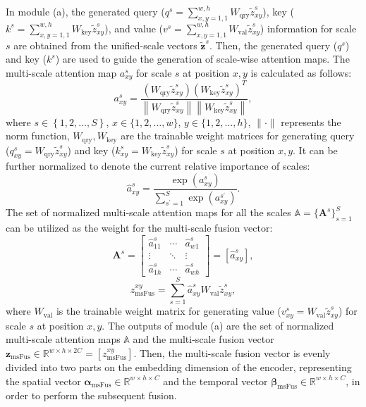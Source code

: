 \documentclass[journal]{IEEEtran}
\begin{document}
In module (a), the generated query ($  q^s = \sum_{x,y=1,1}^{w,h} W_{\mathrm{qry}}  \tilde{z}_{xy}^{s} $), key ($k^s = \sum_{x,y=1,1}^{w,h} W_{\mathrm{key}}  \tilde{z}_{xy}^{s} $), and value ($v^s = \sum_{x,y=1,1}^{w,h} W_{\mathrm{val}}  \tilde{z}_{xy}^{s}$) information for scale $ s $ are obtained from the unified-scale vectors $ \tilde{\mathbf{z}}^{s} $. 
Then, the generated query ($q^s $) and key ($k^s $) are used to guide the generation of scale-wise attention maps. The multi-scale attention map $ a_{xy}^{s} $ for scale $ s $ at position $ x,y $ is calculated as follows:
\begin{equation}
\label{form:5}
a_{xy}^{s}=\frac{\left(W_{\mathrm{qry}}  \tilde{z}_{xy}^{s}\right)\left(W_{\mathrm{key}}  \tilde{z}_{xy}^{s}\right)^{T}}{\left\|W_{\mathrm{qry}}  \tilde{z}_{xy}^{s}\right\|\left\|W_{\mathrm{key}}  \tilde{z}_{xy}^{s}\right\|},
\end{equation}
where $ s \in\left\{1,2, \ldots, S\right\}$,
$x \in\{1,2, \ldots, w\}$,
$y \in\{1,2, \ldots, h\} $,
$ \|\cdot\| $ represents the norm function, $ W_{\mathrm{qry}}, W_{\mathrm{key}} $ are the trainable weight matrices for generating query ($q^s_{xy} = W_{\mathrm{qry}}  \tilde{z}_{xy}^{s}$) and key ($k^s_{xy} = W_{\mathrm{key}}  \tilde{z}_{xy}^{s} $) for scale $s$ at position $x,y$.
It can be further normalized to denote the current relative importance of scales:
\begin{equation}
\hat{a}_{xy}^{s}=\frac{\exp \left({a_{xy}^{s}}\right)}
{\sum_{s^{\prime}=1}^{S} \exp \left({a_{xy}^{s^{\prime}}}\right)}.
\end{equation}
The set of normalized multi-scale attention maps for all the scales $\mathbb{A}=\{\mathbf{A}^{s}\}_{s=1}^{S}$ can be utilized as the weight for the multi-scale fusion vector:
\begin{equation}
\mathbf{A}^{s}=
\begin{bmatrix}
   \hat{a}^s_{11}& \cdots  & \hat{a}^s_{w1} \\
   \vdots & \ddots & \vdots \\
  \hat{a}^s_{1h}& \cdots  & \hat{a}^s_{wh}
\end{bmatrix}
=\left [ \hat{a}_{xy}^{s}\right ],
\end{equation}
\begin{equation}
z_{\mathrm{msFus}}^{xy}=\sum_{s=1}^{S} \hat{a}_{xy}^{s} W_{\mathrm{val}} \widetilde{z}_{xy}^{s},
\end{equation}
where $ W_{\mathrm{val}} $ is the trainable weight matrix for generating value ($v^s_{xy} = W_{\mathrm{val}}  \tilde{z}_{xy}^{s}$) for scale $s$ at position $x,y$. The outputs of module (a) are the set of normalized multi-scale attention maps $\mathbb{A}$ and the multi-scale fusion vector $\mathbf{z}_{\mathrm{msFus}} \in \mathbb{R}^{w \times h \times 2C} = \left [ {z}^{xy}_{\mathrm{msFus}}\right]$. Then, the multi-scale fusion vector is evenly divided into two parts on the embedding dimension of the encoder, representing the spatial vector $\mathbf{\alpha}_{\mathrm{msFus}}\in \mathbb{R}^{w \times h \times C}  $ and the temporal vector $\mathbf{\beta}_{\mathrm{msFus}}\in \mathbb{R}^{w \times h \times C}$, in order to perform the subsequent fusion.
\end{document}
